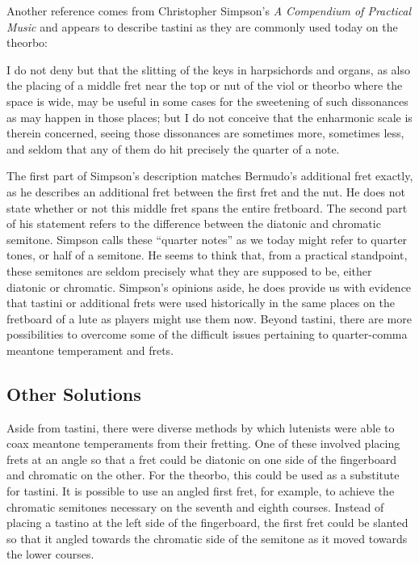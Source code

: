 Another reference comes from Christopher Simpson's \textit{A Compendium of Practical
Music} and appears to describe tastini as they are commonly used today on the theorbo:
\begin{blocks}
I do not deny but that the slitting of the keys in harpsichords and organs, as also the
placing of a middle fret near the top or nut of the viol or theorbo where the space is
wide, may be useful in some cases for the sweetening of such dissonances as may happen
in those places; but I do not conceive that the enharmonic scale is therein concerned,
seeing those dissonances are sometimes more, sometimes less, and seldom that any of them
do hit precisely the quarter of a note. \autocite[51]{CS:1}
\end{blocks}
The first part of Simpson's description matches Bermudo's additional fret exactly, as he describes
an additional fret between the first fret and the nut.  He does not state whether or not this middle
fret spans the entire fretboard.  The second part of his statement refers to the difference between
the diatonic and chromatic semitone. Simpson calls these ``quarter notes'' as we today might refer
to quarter tones, or half of a semitone.  He seems to think that, from a practical standpoint, these
semitones are seldom precisely what they are supposed to be, either diatonic or chromatic. Simpson's
opinions aside, he does provide us with evidence that tastini or additional frets were used
historically in the same places on the fretboard of a lute as players might use them now.  Beyond
tastini, there are more possibilities to overcome some of the difficult issues pertaining to
quarter-comma meantone temperament and frets.

\subsection{Other Solutions}

Aside from tastini, there were diverse methods by which lutenists were able to
coax meantone temperaments from their fretting.  One of these involved placing frets at
an angle so that a fret could be diatonic on one side of the fingerboard and chromatic on
the other.  For the theorbo, this could be used as a substitute for tastini.  It
is possible to use an angled first fret, for example, to achieve the chromatic
semitones necessary on the seventh and eighth courses.  Instead of placing a tastino at
the left side of the fingerboard, the first fret could be slanted so that it
angled towards the chromatic side of the semitone as it moved towards the
lower courses.

